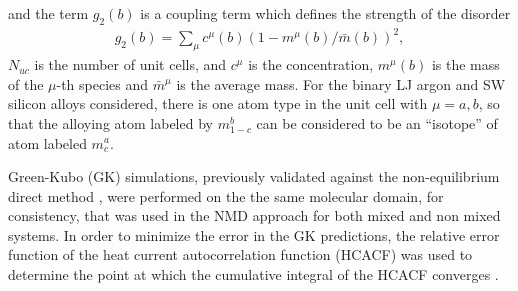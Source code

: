 \documentclass[aps,prb,preprint,preprintnumbers,amsmath,amssymb,floatfix,superscriptaddress]{revtex4}
\begin{document}
and the term $g_2(b)$ is a coupling term which defines the strength of the disorder
\begin{equation}\label{EQ:g(b)}
\begin{split}
g_2(b) = \sum_\mu c^{\mu}(b)(1-m^{\mu}(b)/\bar{m}(b))^2, 
\end{split}
\end{equation}
$N_{uc}$ is the number of unit cells, and $c^\mu$ is the concentration, $m^\mu(b)$ is the mass of the $\mu$-th species and $\bar{m}^{\mu}$ is the average mass. For the binary LJ argon and SW silicon alloys considered, there is one atom type in the unit cell with $\mu=a,b$, so that the alloying atom labeled by $m^b_{1-c}$ can be considered to be an ``isotope'' of atom labeled $m^a_{c}$. 

Green-Kubo (GK) simulations, previously validated against the non-equilibrium direct method \cite {PhysRevB.79.075316}, were performed on the the same molecular domain, for consistency, that was used in the NMD approach for both mixed and non mixed systems. In order to minimize the error in the GK predictions, the relative error function of the heat current autocorrelation function (HCACF) was used to determine the point at which the cumulative integral of the HCACF converges \cite{Chen20102392}.
\end{document}
